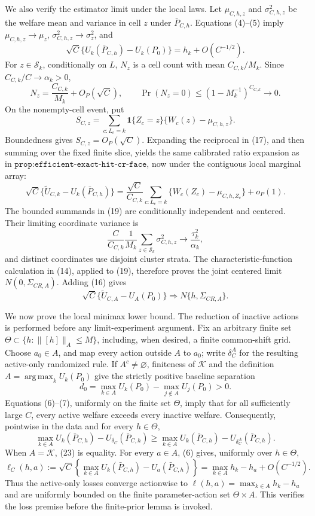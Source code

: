 We also verify the estimator limit under the local laws.  Let \(\mu_{C,h,z}\) and \(\sigma_{C,h,z}^2\) be the welfare mean and variance in cell \(z\) under \(\bar P_{C,h}\).  Equations (4)--(5) imply \(\mu_{C,h,z}\to\mu_z\), \(\sigma_{C,h,z}^2\to\sigma_z^2\), and
\[
\sqrt C\{U_k(\bar P_{C,h})-U_k(P_0)\}=h_k+O(C^{-1/2}).
\tag{16}
\]
For \(z\in\mathcal S_k\), conditionally on \(L\), \(N_z\) is a cell count with mean \(C_{C,k}/M_k\).  Since \(C_{C,k}/C\to\alpha_k>0\),
\[
N_z=\frac{C_{C,k}}{M_k}+O_P(\sqrt C),
\qquad
\Pr(N_z=0)\leq(1-M_k^{-1})^{C_{C,k}}\longrightarrow0.
\tag{17}
\]
On the nonempty-cell event, put
\[
S_{C,z}=\sum_{c:L_c=k}\mathbf1\{Z_c=z\}
\{W_c(z)-\mu_{C,h,z}\}.
\tag{18}
\]
Boundedness gives \(S_{C,z}=O_P(\sqrt C)\).  Expanding the reciprocal in (17), and then summing over the fixed finite slice, yields the same calibrated ratio expansion as in \(\texttt{prop:efficient-exact-hit-cr-face}\), now under the contiguous local marginal array:
\[
\sqrt C\{\widetilde U_{C,k}-U_k(\bar P_{C,h})\}
=\frac{\sqrt C}{C_{C,k}}
\sum_{c:L_c=k}\{W_c(Z_c)-\mu_{C,h,Z_c}\}+o_P(1).
\tag{19}
\]
The bounded summands in (19) are conditionally independent and centered.  Their limiting coordinate variance is
\[
\frac{C}{C_{C,k}}
\frac1{M_k}\sum_{z\in\mathcal S_k}\sigma_{C,h,z}^2
\longrightarrow\frac{\tau_k^2}{\alpha_k},
\tag{20}
\]
and distinct coordinates use disjoint cluster strata.  The characteristic-function calculation in (14), applied to (19), therefore proves the joint centered limit \(N(0,\Sigma_{CR,A})\).  Adding (16) gives
\[
\sqrt C\{\widetilde U_{C,A}-U_A(P_0)\}
\Rightarrow N\{h,\Sigma_{CR,A}\}.
\tag{21}
\]

We now prove the local minimax lower bound.  The reduction of inactive actions is performed before any limit-experiment argument.  Fix an arbitrary finite set \(\Theta\subset\{h:\lVert[h]\rVert_A\leq M\}\), including, when desired, a finite common-shift grid.  Choose \(a_0\in A\), and map every action outside \(A\) to \(a_0\); write \(\delta_C^A\) for the resulting active-only randomized rule.  If \(A^c\ne\varnothing\), finiteness of \(\mathcal K\) and the definition \(A=\operatorname*{arg\,max}_kU_k(P_0)\) give the strictly positive baseline separation
\[
d_0=\max_{k\in A}U_k(P_0)-\max_{j\notin A}U_j(P_0)>0.
\tag{22}
\]
Equations (6)--(7), uniformly on the finite set \(\Theta\), imply that for all sufficiently large \(C\), every active welfare exceeds every inactive welfare.  Consequently, pointwise in the data and for every \(h\in\Theta\),
\[
\max_{k\in A}U_k(\bar P_{C,h})-U_{\delta_C}(\bar P_{C,h})
\geq
\max_{k\in A}U_k(\bar P_{C,h})-U_{\delta_C^A}(\bar P_{C,h}).
\tag{23}
\]
When \(A=\mathcal K\), (23) is equality.  For every \(a\in A\), (6) gives, uniformly over \(h\in\Theta\),
\[
\ell_C(h,a):=\sqrt C\left\{
\max_{k\in A}U_k(\bar P_{C,h})-U_a(\bar P_{C,h})
\right\}
=\max_{k\in A}h_k-h_a+O(C^{-1/2}).
\tag{24}
\]
Thus the active-only losses converge actionwise to \(\ell(h,a)=\max_{k\in A}h_k-h_a\) and are uniformly bounded on the finite parameter-action set \(\Theta\times A\).  This verifies the loss premise before the finite-prior lemma is invoked.

